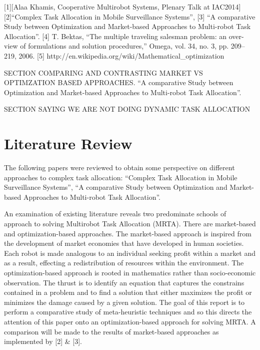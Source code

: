 \documentclass[a4paper]{article}
\begin{document}
 [1][Alaa Khamis, Cooperative Multirobot Systems, Plenary Talk at IAC2014]
 [2]``Complex Task Allocation in Mobile Surveillance Systems'',
 [3] ``A comparative Study between Optimization and
Market-based Approaches to Multi-robot Task Allocation''.
[4] T. Bektas, “The multiple traveling salesman problem: an over- view of formulations and solution procedures,” Omega, vol. 34, no. 3, pp. 209–219, 2006.
[5] http://en.wikipedia.org/wiki/Mathematical\_optimization

SECTION COMPARING AND CONTRASTING MARKET VS OPTIMZATION BASED APPROACHES.
``A comparative Study between Optimization and
Market-based Approaches to Multi-robot Task Allocation''.

SECTION SAYING WE ARE NOT DOING DYNAMIC TASK ALLOCATION


\section{Literature Review}
The following papers were reviewed to obtain some perspective on different approaches to complex task allocation:
``Complex Task Allocation in Mobile Surveillance Systems'', ``A comparative Study between Optimization and
Market-based Approaches to Multi-robot Task Allocation''.

An examination of existing literature reveals two predominate schools of approach to solving Multirobot Task Allocation (MRTA). There are market-based and optimization-based approaches.
The market-based approach is inspired from the development of market economies that have developed in human societies.
Each robot is made analogous to an individual seeking profit within a market and as a result, effecting a redistribution of resources within the environment.
The optimization-based approach is rooted in mathematics rather than socio-economic observation.
The thrust is to identify an equation that captures the constrains contained in a problem and to find a solution that either maximizes the profit or minimizes the damage caused by a given solution.
The goal of this report is to perform a comparative study of meta-heuristic techniques and so this directs the attention of this paper onto an optimization-based approach for solving MRTA.
A comparison will be made to the results of market-based approaches as implemented by [2] \& [3].
\end{document}
